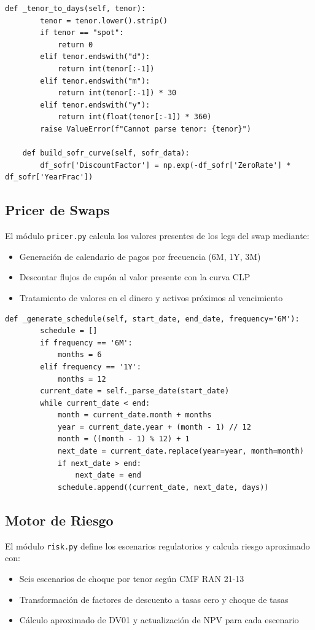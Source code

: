 \documentclass[12pt,a4paper]{article}
\begin{document}
\begin{lstlisting}[caption={Extracción de \texttt{curve_builder.py}}]
    def _tenor_to_days(self, tenor):
        tenor = tenor.lower().strip()
        if tenor == "spot":
            return 0
        elif tenor.endswith("d"):
            return int(tenor[:-1])
        elif tenor.endswith("m"):
            return int(tenor[:-1]) * 30
        elif tenor.endswith("y"):
            return int(float(tenor[:-1]) * 360)
        raise ValueError(f"Cannot parse tenor: {tenor}")

    def build_sofr_curve(self, sofr_data):
        df_sofr['DiscountFactor'] = np.exp(-df_sofr['ZeroRate'] * df_sofr['YearFrac'])
\end{lstlisting}

\subsection*{Pricer de Swaps}
El módulo \texttt{pricer.py} calcula los valores presentes de los legs del swap mediante:
\begin{itemize}
    \item Generación de calendario de pagos por frecuencia (6M, 1Y, 3M)
    \item Descontar flujos de cupón al valor presente con la curva CLP
    \item Tratamiento de valores en el dinero y activos próximos al vencimiento
\end{itemize}

\begin{lstlisting}[caption={Extracción de \texttt{pricer.py}}]
    def _generate_schedule(self, start_date, end_date, frequency='6M'):
        schedule = []
        if frequency == '6M':
            months = 6
        elif frequency == '1Y':
            months = 12
        current_date = self._parse_date(start_date)
        while current_date < end:
            month = current_date.month + months
            year = current_date.year + (month - 1) // 12
            month = ((month - 1) % 12) + 1
            next_date = current_date.replace(year=year, month=month)
            if next_date > end:
                next_date = end
            schedule.append((current_date, next_date, days))
\end{lstlisting}

\subsection*{Motor de Riesgo}
El módulo \texttt{risk.py} define los escenarios regulatorios y calcula riesgo aproximado con:
\begin{itemize}
    \item Seis escenarios de choque por tenor según CMF RAN 21-13
    \item Transformación de factores de descuento a tasas cero y choque de tasas
    \item Cálculo aproximado de DV01 y actualización de NPV para cada escenario
\end{itemize}
\end{document}
